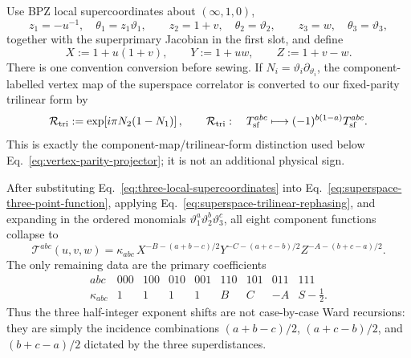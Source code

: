 \documentclass[11pt]{article}
\newcommand{\half}{\tfrac12}
\begin{document}
Use BPZ local supercoordinates about \((\infty,1,0)\),
\begin{equation}
 z_1=-u^{-1},\quad \theta_1=z_1\vartheta_1,
 \qquad
 z_2=1+v,\quad \theta_2=\vartheta_2,
 \qquad
 z_3=w,\quad \theta_3=\vartheta_3,
 \label{eq:three-local-supercoordinates}
\end{equation}
together with the superprimary Jacobian in the first slot, and define
\begin{equation}
 X:=1+u(1+v),\qquad Y:=1+uw,\qquad Z:=1+v-w.
 \label{eq:xyz-local-polynomials}
\end{equation}
There is one convention conversion before sewing.  If
\(N_i=\vartheta_i\partial_{\vartheta_i}\), the component-labelled vertex
map of the superspace correlator is converted to our fixed-parity trilinear
form by
\begin{equation}
 \mathcal R_{\rm tri}
 :=\exp\!\left[i\pi N_2(1-N_1)\right],
 \qquad
 \mathcal R_{\rm tri}:\quad
 T_{\rm sf}^{abc}\longmapsto
 (-1)^{b(1-a)}T_{\rm sf}^{abc}.
 \label{eq:superspace-trilinear-rephasing}
\end{equation}
This is exactly the component-map/trilinear-form distinction used below
Eq.~\eqref{eq:vertex-parity-projector}; it is not an additional physical
sign.

After substituting Eq.~\eqref{eq:three-local-supercoordinates} into
Eq.~\eqref{eq:superspace-three-point-function}, applying
Eq.~\eqref{eq:superspace-trilinear-rephasing}, and expanding in the ordered
monomials \(\vartheta_1^a\vartheta_2^b\vartheta_3^c\), all eight component
functions collapse to
\begin{equation}
\boxed{
 \mathscr T^{abc}(u,v,w)
 =\kappa_{abc}\,
 X^{-B-(a+b-c)/2}
 Y^{-C-(a+c-b)/2}
 Z^{-A-(b+c-a)/2}.}
 \label{eq:compact-superspace-component-kernel}
\end{equation}
The only remaining data are the primary coefficients
\begin{equation}
\begin{array}{c|cccccccc}
abc&000&100&010&001&110&101&011&111\\
\hline
\kappa_{abc}&1&1&1&1&B&C&-A&S-\half.
\end{array}
\label{eq:superspace-kappa-table}
\end{equation}
Thus the three half-integer exponent shifts are not case-by-case Ward
recursions: they are simply the incidence combinations
\((a+b-c)/2\), \((a+c-b)/2\), and \((b+c-a)/2\) dictated by the three
superdistances.
\end{document}
